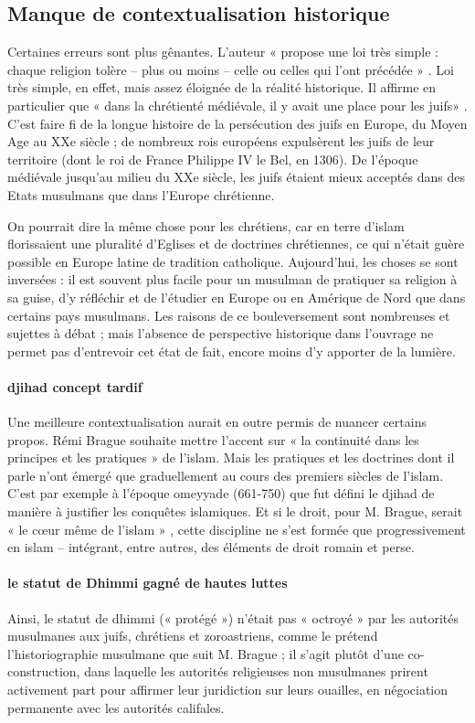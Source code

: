  \subsection{Manque de contextualisation historique}


Certaines erreurs sont plus gênantes. L’auteur « propose une loi très simple : chaque religion tolère – plus ou moins – celle ou celles qui l’ont précédée » . Loi très simple, en effet, mais assez éloignée de la réalité historique. Il affirme en particulier que « dans la chrétienté médiévale, il y avait une place pour les juifs» . C’est faire fi de la longue histoire de la persécution des juifs en Europe, du Moyen Age au XXe siècle ; de nombreux rois européens expulsèrent les juifs de leur territoire (dont le roi de France Philippe IV le Bel, en 1306). De l’époque médiévale jusqu’au milieu du XXe siècle, les juifs étaient mieux acceptés dans des Etats musulmans que dans l’Europe chrétienne.

On pourrait dire la même chose pour les chrétiens, car en terre d’islam florissaient une pluralité d’Eglises et de doctrines chrétiennes, ce qui n’était guère possible en Europe latine de tradition catholique. Aujourd’hui, les choses se sont inversées : il est souvent plus facile pour un musulman de pratiquer sa religion à sa guise, d’y réfléchir et de l’étudier en Europe ou en Amérique de
Nord que dans certains pays musulmans. Les raisons de ce bouleversement sont nombreuses et sujettes à débat ; mais l’absence de perspective historique dans l’ouvrage ne permet pas d’entrevoir cet état de fait, encore moins d’y apporter de la lumière.

\paragraph{djihad concept tardif}
Une meilleure contextualisation aurait en outre permis de nuancer certains propos. Rémi Brague souhaite mettre l’accent sur « la continuité dans les principes et les pratiques » de l’islam. Mais les pratiques et les doctrines dont il parle n’ont émergé que graduellement au cours des premiers siècles de l’islam. C’est par exemple à l’époque omeyyade (661-750) que fut défini le djihad de manière à justifier les conquêtes islamiques. Et si le droit, pour M. Brague, serait « le cœur même de l’islam » , cette discipline ne s’est formée que progressivement en islam – intégrant, entre autres, des éléments de droit romain et perse. 
 \paragraph{le statut de Dhimmi gagné de hautes luttes} Ainsi, le statut de dhimmi (« protégé ») n’était pas « octroyé » par les autorités musulmanes aux juifs, chrétiens et zoroastriens, comme le prétend l’historiographie musulmane que suit M. Brague ; il s’agit plutôt d’une co-construction, dans laquelle les autorités religieuses non musulmanes prirent activement part pour affirmer leur juridiction sur leurs ouailles, en négociation permanente avec les autorités califales.

